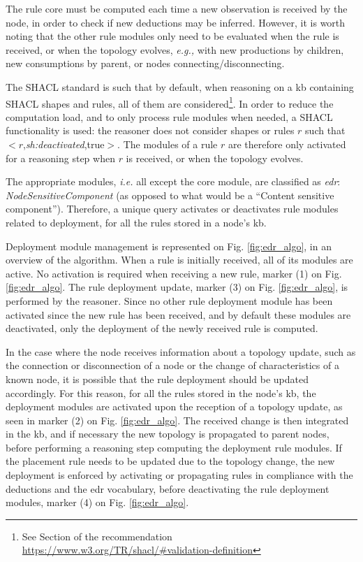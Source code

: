 \documentclass{iosart2c}
\newcommand{\namespace}[1]{\textit{#1$:$}}
\newcommand{\concept}[2]{\namespace{#1}\-\textit{#2}}
\newcommand{\triplet}[3]{$<$#1,\textit{#2},#3$>$}
\begin{document}
The rule core must be computed each time a new observation is received by the node, in order to check if new deductions may be inferred.
However, it is worth noting that the other rule modules only need to be evaluated when the rule is received, or when the topology evolves, \textit{e.g.,} with new productions by children, new consumptions by parent, or nodes connecting/disconnecting.

The SHACL standard is such that by default, when reasoning on a \gls{kb} containing SHACL shapes and rules, all of them are considered\footnote{See Section  of the recommendation \url{https://www.w3.org/TR/shacl/\#validation-definition}}.
In order to reduce the computation load, and to only process rule modules when needed, a SHACL functionality is used: the reasoner does not consider shapes or rules $r$ such that \triplet{$r$}{sh:deactivated}{true}.
The modules of a rule $r$ are therefore only activated for a reasoning step when $r$ is received, or when the topology evolves.

The appropriate modules, \textit{i.e.} all except the core module, are classified as \concept{edr}{Node\-Sensitive\-Component} (as opposed to what would be a ``Content sensitive component'').
Therefore, a unique query activates or deactivates rule modules related to deployment, for all the rules stored in a node's \gls{kb}.

Deployment module management is represented on Fig. \ref{fig:edr_algo}, in an overview of the algorithm.
When a rule is initially received, all of its modules are active. 
No activation is required when receiving a new rule, marker (1) on Fig. \ref{fig:edr_algo}. 
The rule deployment update, marker (3) on Fig. \ref{fig:edr_algo}, is performed by the reasoner.
Since no other rule deployment module has been activated since the new rule has been received, and by default these modules are deactivated, only the deployment of the newly received rule is computed.

In the case where the node receives information about a topology update, such as the connection or disconnection of a node or the change of characteristics of a known node, it is possible that the rule deployment should be updated accordingly.
For this reason, for all the rules stored in the node's \gls{kb}, the deployment modules are activated upon the reception of a topology update, as seen in marker (2) on Fig. \ref{fig:edr_algo}.
The received change is then integrated in the \gls{kb}, and if necessary the new topology is propagated to parent nodes, before performing a reasoning step computing the deployment rule modules.
If the placement rule needs to be updated due to the topology change, the new deployment is enforced by activating or propagating rules in compliance with the deductions and the \gls{edr} vocabulary, before deactivating the rule deployment modules, marker (4) on Fig. \ref{fig:edr_algo}.
\end{document}
